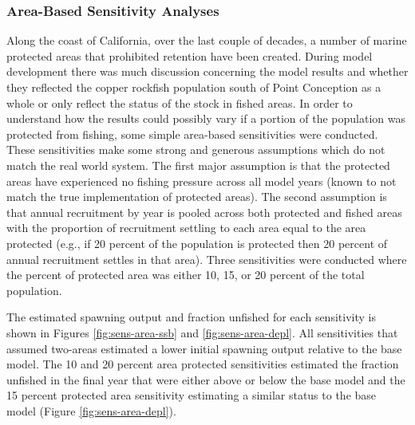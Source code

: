 \documentclass[11pt,
  english,
  a4paper,
]{article}
\begin{document}
\leavevmode\tagmcend\tagstructend\par


\hypertarget{area-based-sensitivity-analyses}{%
\subsubsection{Area-Based Sensitivity Analyses}\label{area-based-sensitivity-analyses}}

\leavevmode\tagmcend\tagstructend


Along the coast of California, over the last couple of decades, a number of marine protected areas that prohibited retention have been created. During model development there was much discussion concerning the model results and whether they reflected the copper rockfish population south of Point Conception as a whole or only reflect the status of the stock in fished areas. In order to understand how the results could possibly vary if a portion of the population was protected from fishing, some simple area-based sensitivities were conducted. These sensitivities make some strong and generous assumptions which do not match the real world system. The first major assumption is that the protected areas have experienced no fishing pressure across all model years (known to not match the true implementation of protected areas). The second assumption is that annual recruitment by year is pooled across both protected and fished areas with the proportion of recruitment settling to each area equal to the area protected (e.g., if 20 percent of the population is protected then 20 percent of annual recruitment settles in that area). Three sensitivities were conducted where the percent of protected area was either 10, 15, or 20 percent of the total population.

\leavevmode\tagmcend\tagstructend\par


The estimated spawning output and fraction unfished for each sensitivity is shown in Figures \ref{fig:sens-area-ssb} and \ref{fig:sens-area-depl}. All sensitivities that assumed two-areas estimated a lower initial spawning output relative to the base model. The 10 and 20 percent area protected sensitivities estimated the fraction unfished in the final year that were either above or below the base model and the 15 percent protected area sensitivity estimating a similar status to the base model (Figure \ref{fig:sens-area-depl}).
\end{document}
